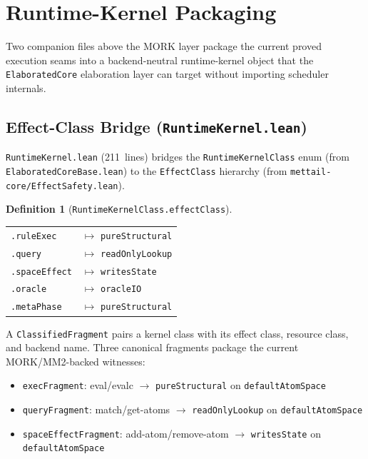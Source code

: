 \documentclass[11pt]{article}
\theoremstyle{definition}
\newtheorem{definition}[theorem]{Definition}
\theoremstyle{remark}
\newcommand{\MORK}{\textup{MORK}}
\begin{document}
\section{Runtime-Kernel Packaging}
\label{sec:runtimekernel}

Two companion files above the \MORK{} layer package the current proved
execution seams into a backend-neutral runtime-kernel object that the
\texttt{ElaboratedCore} elaboration layer can target without importing
scheduler internals.

\subsection{Effect-Class Bridge (\texttt{RuntimeKernel.lean})}

\texttt{RuntimeKernel.lean} (211~lines) bridges the \texttt{RuntimeKernelClass}
enum (from \texttt{ElaboratedCoreBase.lean}) to the \texttt{EffectClass}
hierarchy (from \texttt{mettail-core/EffectSafety.lean}).

\begin{definition}[\texttt{RuntimeKernelClass.effectClass}]
\begin{tabular}{@{}ll@{}}
\texttt{.ruleExec} & $\mapsto$ \texttt{pureStructural} \\
\texttt{.query} & $\mapsto$ \texttt{readOnlyLookup} \\
\texttt{.spaceEffect} & $\mapsto$ \texttt{writesState} \\
\texttt{.oracle} & $\mapsto$ \texttt{oracleIO} \\
\texttt{.metaPhase} & $\mapsto$ \texttt{pureStructural}
\end{tabular}
\end{definition}

\noindent
A \texttt{ClassifiedFragment} pairs a kernel class with its effect class,
resource class, and backend name.
Three canonical fragments package the current \MORK{}/MM2-backed witnesses:
\begin{itemize}[nosep]
  \item \texttt{execFragment}: eval/evalc $\to$ \texttt{pureStructural} on \texttt{defaultAtomSpace}
  \item \texttt{queryFragment}: match/get-atoms $\to$ \texttt{readOnlyLookup} on \texttt{defaultAtomSpace}
  \item \texttt{spaceEffectFragment}: add-atom/remove-atom $\to$ \texttt{writesState} on \texttt{defaultAtomSpace}
\end{itemize}
\end{document}
